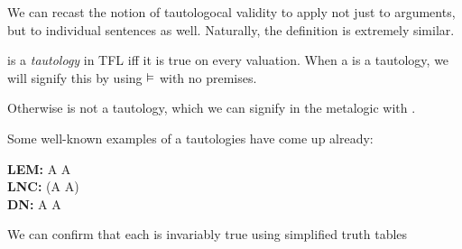 We can recast the notion of tautologocal validity to apply not just to
arguments, but to individual sentences as well. Naturally, the definition is
extremely similar.

\begin{definition}[Tautology]
  \label{def:tfl-tautology}
  \sphi is a \emph{tautology} in TFL iff it is true on every valuation. When
  a \sphi is a tautology, we will signify this by using $\vDash$ with no
  premises.
  \begin{argument}
    \item[ ] \eentails\ephi
  \end{argument}
  Otherwise \sphi is not a tautology, which we can signify in the metalogic with
  \enotentails.
  \begin{argument}
    \item[ ] \enotentails\ephi
  \end{argument}
\end{definition}

Some well-known examples of a tautologies have come up already:

\begin{center}
    \textbf{LEM:} A \eor \enot A         \\
    \textbf{LNC:} \enot(A \eand \enot A) \\
    \textbf{DN:} \enot\enot A \eiff A    \\
\end{center}

We can confirm that each is invariably true using simplified truth tables

